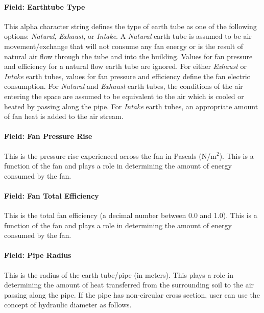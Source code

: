 \paragraph{Field: Earthtube Type}\label{field-earthtube-type}

This alpha character string defines the type of earth tube as one of the following options: \emph{Natural}, \emph{Exhaust}, or \emph{Intake}. A \emph{Natural} earth tube is assumed to be air movement/exchange that will not consume any fan energy or is the result of natural air flow through the tube and into the building. Values for fan pressure and efficiency for a natural flow earth tube are ignored. For either \emph{Exhaust} or \emph{Intake} earth tubes, values for fan pressure and efficiency define the fan electric consumption. For \emph{Natural} and \emph{Exhaust} earth tubes, the conditions of the air entering the space are assumed to be equivalent to the air which is cooled or heated by passing along the pipe. For \emph{Intake} earth tubes, an appropriate amount of fan heat is added to the air stream.

\paragraph{Field: Fan Pressure Rise}\label{field-fan-pressure-rise-1}

This is the pressure rise experienced across the fan in Pascals (N/m\(^{2}\)). This is a function of the fan and plays a role in determining the amount of energy consumed by the fan.

\paragraph{Field: Fan Total Efficiency}\label{field-fan-total-efficiency-1}

This is the total fan efficiency (a decimal number between 0.0 and 1.0). This is a function of the fan and plays a role in determining the amount of energy consumed by the fan.

\paragraph{Field: Pipe Radius}\label{field-pipe-radius}

This is the radius of the earth tube/pipe (in meters). This plays a role in determining the amount of heat transferred from the surrounding soil to the air passing along the pipe. If the pipe has non-circular cross section, user can use the concept of hydraulic diameter as follows.

